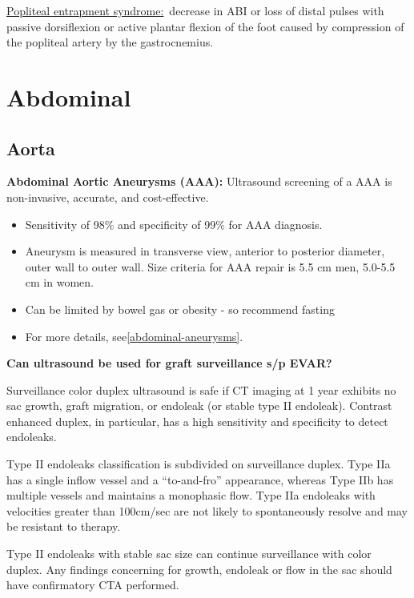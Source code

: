 \documentclass[
]{book}
\begin{document}
\uline{Popliteal entrapment syndrome:}~decrease in ABI or loss of
distal pulses with passive dorsiflexion or active plantar flexion of the
foot caused by compression of the popliteal artery by the gastrocnemius.

\hypertarget{abdominal}{%
\section{Abdominal}\label{abdominal}}

\hypertarget{aorta}{%
\subsection{Aorta}\label{aorta}}

\textbf{Abdominal Aortic Aneurysms (AAA):} Ultrasound screening of a AAA is
non-invasive, accurate, and cost-effective.\citep{chaikof2018}

\begin{itemize}
\item
  Sensitivity of 98\% and specificity of 99\% for AAA
  diagnosis.\citep{wilmink2002}
\item
  Aneurysm is measured in transverse view, anterior to posterior
  diameter, outer wall to outer wall.\citep{iac2021} Size criteria for AAA
  repair is 5.5 cm men, 5.0-5.5 cm in women.
\item
  Can be limited by bowel gas or obesity - so recommend fasting
\item
  For more details, see\ref{abdominal-aneurysms}.
\end{itemize}

\textbf{Can ultrasound be used for graft surveillance s/p EVAR?}

Surveillance color duplex ultrasound is safe if CT imaging at 1 year
exhibits no sac growth, graft migration, or endoleak (or stable type II
endoleak). Contrast enhanced duplex, in particular, has a high
sensitivity and specificity to detect endoleaks.\citep{abraha2017, kapetanios2019, chaer2009}

Type II endoleaks classification is subdivided on surveillance duplex.
Type IIa has a single inflow vessel and a ``to-and-fro'' appearance,
whereas Type IIb has multiple vessels and maintains a monophasic flow.
Type IIa endoleaks with velocities greater than 100cm/sec are not likely
to spontaneously resolve and may be resistant to therapy.\citep{arko2003, vanmarrewijk2004}

Type II endoleaks with stable sac size can continue surveillance with
color duplex.\citep{chaikof2018, karthikesalingam2012, chaer2009} Any
findings concerning for growth, endoleak or flow in the sac should have
confirmatory CTA performed.\citep{maleux2017}
\end{document}
